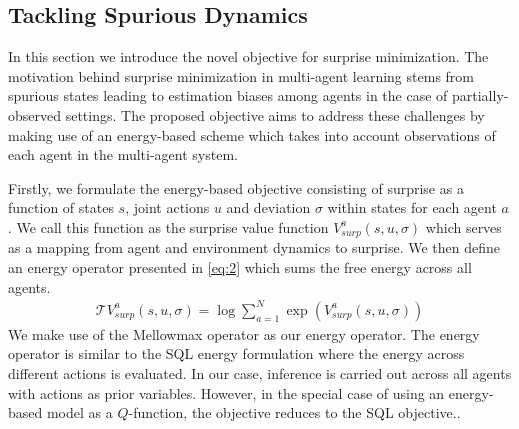 \documentclass{article}
\begin{document}
\begin{multicols}{2}
\section{Tackling Spurious Dynamics}
In this section we introduce the novel objective for surprise minimization. The motivation behind surprise minimization in multi-agent learning stems from spurious states leading to estimation biases among agents in the case of partially-observed settings. The proposed objective aims to address these challenges by making use of an energy-based scheme which takes into account observations of each agent in the multi-agent system. 

Firstly, we formulate the energy-based objective consisting of surprise as a function of states $s$, joint actions $u$ and deviation $\sigma$ within states for each agent $a$. We call this function as the surprise value function $V_{surp}^{a}(s,u,\sigma)$ which serves as a mapping from agent and environment dynamics to surprise. We then define an energy operator presented in \autoref{eq:2} which sums the free energy across all agents. 
\begin{gather}
    \mathcal{T}V^{a}_{surp}(s,u,\sigma) = \log \sum_{a=1}^{N} \exp{(V^{a}_{surp}(s,u,\sigma))} \label{eq:2}
\end{gather}
We make use of the Mellowmax operator \cite{mellowmax} as our energy operator. The energy operator is similar to the SQL energy formulation \cite{sql} where the energy across different actions is evaluated. In our case, inference is carried out across all agents with actions as prior variables. However, in the special case of using an energy-based model as a $Q$-function, the objective reduces to the SQL objective.. 


\end{multicols}
\end{document}
